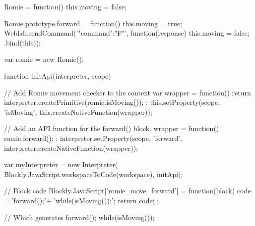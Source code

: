 \begin{center}
\begin{minipage}{.9\textwidth}
\singlespace
{}
\begin{pyglist}[language=javascript, caption={Robot movement function.},
	label={alg:move_func}, listingname={Algorithm}, numbers=left]
Romie = function() {
    this.moving = false;
}

Romie.prototype.forward = function() {
    this.moving = true;
    Weblab.sendCommand('{"command":"F"}', function(response) {
        this.moving = false;
    }.bind(this));
}

var romie = new Romie();
\end{pyglist}
\end{minipage}
\end{center}

\begin{center}
\begin{minipage}{.9\textwidth}
\singlespace
{}
\begin{pyglist}[language=javascript, caption={Function wrapper.},
	label={alg:wrapper}, listingname={Algorithm}, numbers=left]
function initApi(interpreter, scope) {
	// Add Romie movement checker to the context
	var wrapper = function() {
		return interpreter.createPrimitive(romie.isMoving());
	};
	this.setProperty(scope, 'isMoving',
		this.createNativeFunction(wrapper));

	// Add an API function for the forward() block.
	wrapper = function() {
		romie.forward();
	};
	interpreter.setProperty(scope, 'forward',
		interpreter.createNativeFunction(wrapper));
}
var myInterpreter = new Interpreter(
	Blockly.JavaScript.workspaceToCode(workspace),
	initApi);
\end{pyglist}
\end{minipage}
\end{center}

\begin{center}
\begin{minipage}{.9\textwidth}
\singlespace
{}
\begin{pyglist}[language=javascript, caption={Generated code.},
	label={alg:generated}, listingname={Algorithm}, numbers=left]
// Block code
Blockly.JavaScript['romie_move_forward'] = function(block) {
    code = 'forward();\n'+
            'while(isMoving());\n';
    return code;
};

// Which generates
forward();
while(isMoving());
\end{pyglist}
\end{minipage}
\end{center}

